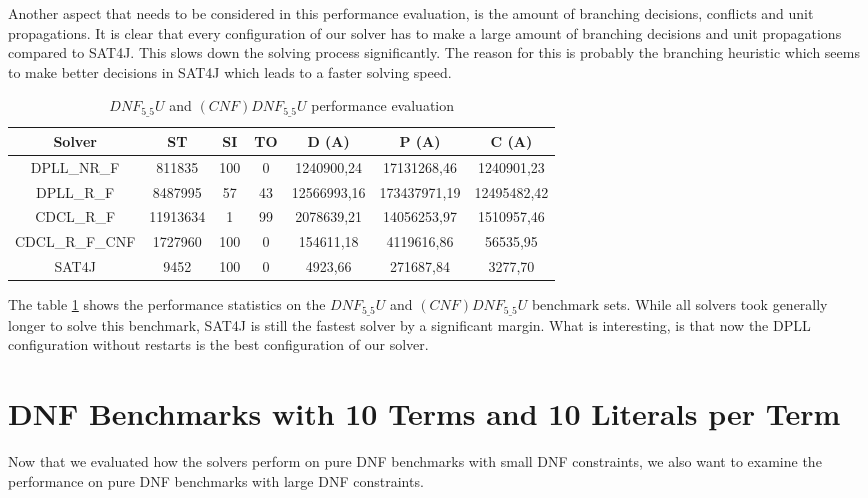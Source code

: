Another aspect that needs to be considered in this performance evaluation, is the amount of branching decisions, conflicts and unit propagations. It is clear that every configuration of our solver has to make a large amount of branching decisions and unit propagations compared to SAT4J. This slows down the solving process significantly. The reason for this is probably the branching heuristic which seems to make better decisions in SAT4J which leads to a faster solving speed.


\begin{table}[!htb]
\centering
\caption{$DNF_{5\_5}U$ and $(CNF)DNF_{5\_5}U$ performance evaluation}
\label{tab:dnf55Unsat}
\begin{tabular}{|c|c|c|c|c|c|c|}
\hline
Solver & ST & SI & TO & D (A) & P (A) & C (A)\\
\hline
DPLL\_NR\_F & 811835 & 100 & 0 & 1240900,24 & 17131268,46 & 1240901,23 \\
\hline
DPLL\_R\_F & 8487995 & 57 & 43 & 12566993,16 & 173437971,19 & 12495482,42 \\
\hline
CDCL\_R\_F & 11913634 & 1 & 99 & 2078639,21 & 14056253,97 & 1510957,46 \\
\hline
CDCL\_R\_F\_CNF & 1727960 & 100 & 0 & 154611,18 & 4119616,86 & 56535,95 \\
\hline
SAT4J & 9452 & 100 & 0 & 4923,66 & 271687,84 & 3277,70 \\
\hline
\end{tabular}
\end{table}

The table \ref{tab:dnf55Unsat} shows the performance statistics on the $DNF_{5\_5}U$ and $(CNF)DNF_{5\_5}U$ benchmark sets. While all solvers took generally longer to solve this benchmark, SAT4J is still the fastest solver by a significant margin. What is interesting, is that now the DPLL configuration without restarts is the best configuration of our solver.

\section{DNF Benchmarks with 10 Terms and 10 Literals per Term}

Now that we evaluated how the solvers perform on pure DNF benchmarks with small DNF constraints, we also want to examine the performance on pure DNF benchmarks with large DNF constraints.


